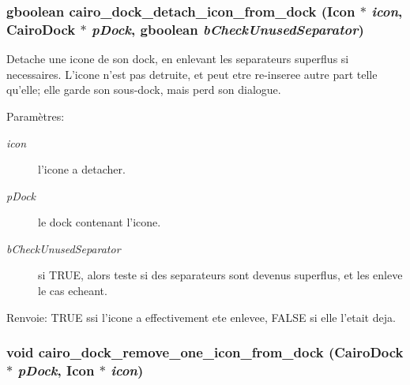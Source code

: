 \subsubsection{\setlength{\rightskip}{0pt plus 5cm}gboolean cairo\_\-dock\_\-detach\_\-icon\_\-from\_\-dock ({\bf Icon} $\ast$ {\em icon}, {\bf CairoDock} $\ast$ {\em pDock}, gboolean {\em bCheckUnusedSeparator})}\label{cairo-dock-icons_8h_612fb1983b7cee66c5724a57610e5688}


Detache une icone de son dock, en enlevant les separateurs superflus si necessaires. L'icone n'est pas detruite, et peut etre re-inseree autre part telle qu'elle; elle garde son sous-dock, mais perd son dialogue. \begin{Desc}
\item[Paramètres:]
\begin{description}
\item[{\em icon}]l'icone a detacher. \item[{\em pDock}]le dock contenant l'icone. \item[{\em bCheckUnusedSeparator}]si TRUE, alors teste si des separateurs sont devenus superflus, et les enleve le cas echeant. \end{description}
\end{Desc}
\begin{Desc}
\item[Renvoie:]TRUE ssi l'icone a effectivement ete enlevee, FALSE si elle l'etait deja. \end{Desc}
\subsubsection{\setlength{\rightskip}{0pt plus 5cm}void cairo\_\-dock\_\-remove\_\-one\_\-icon\_\-from\_\-dock ({\bf CairoDock} $\ast$ {\em pDock}, {\bf Icon} $\ast$ {\em icon})}\label{cairo-dock-icons_8h_d66a0e6a2a1922353b51d07c8f07423e}


